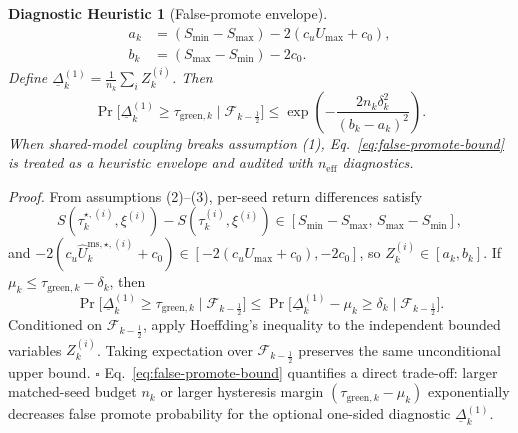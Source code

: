 \documentclass[letterpaper,10pt,conference]{ieeeconf}
\newtheorem{heuristic}{Diagnostic Heuristic}
\begin{document}
\begin{heuristic}[False-promote envelope]
\[
\begin{aligned}
a_k &= (S_{\min}-S_{\max})-2(c_uU_{\max}+c_0),\\
b_k &= (S_{\max}-S_{\min})-2c_0.
\end{aligned}
\]
Define $\underline{\Delta}_k^{(1)}=\frac{1}{n_k}\sum_i Z_k^{(i)}$. Then
\begin{equation}
\Pr\!\big[\underline{\Delta}_k^{(1)}\ge \tau_{\text{green},k}\mid \mathcal{F}_{k-\frac{1}{2}}\big]
\le
\exp\!\left(-\frac{2n_k \delta_k^2}{(b_k-a_k)^2}\right).
\label{eq:false-promote-bound}
\end{equation}
When shared-model coupling breaks assumption (1), Eq.~\ref{eq:false-promote-bound} is treated as a heuristic envelope and audited with $n_{\mathrm{eff}}$ diagnostics.
\end{heuristic}
\noindent\textit{Proof.}
From assumptions (2)--(3), per-seed return differences satisfy
\[
S(\tau_k^{\star,(i)},\xi^{(i)})-S(\tau_k^{(i)},\xi^{(i)})\in[S_{\min}-S_{\max},\,S_{\max}-S_{\min}],
\]
and $-2(c_u\widehat{U}^{\mathrm{ms},\star,(i)}_k+c_0)\in[-2(c_uU_{\max}+c_0),-2c_0]$, so
$Z_k^{(i)}\in[a_k,b_k]$.
If $\mu_k\le \tau_{\text{green},k}-\delta_k$, then
\[
\Pr\!\big[\underline{\Delta}_k^{(1)}\ge \tau_{\text{green},k}\mid \mathcal{F}_{k-\frac{1}{2}}\big]
\le
\Pr\!\big[\underline{\Delta}_k^{(1)}-\mu_k\ge \delta_k\mid \mathcal{F}_{k-\frac{1}{2}}\big].
\]
Conditioned on $\mathcal{F}_{k-\frac{1}{2}}$, apply Hoeffding's inequality to the independent bounded variables $Z_k^{(i)}$.
Taking expectation over $\mathcal{F}_{k-\frac{1}{2}}$ preserves the same unconditional upper bound.
\hfill$\square$
Eq.~\ref{eq:false-promote-bound} quantifies a direct trade-off: larger matched-seed budget $n_k$ or larger hysteresis margin $(\tau_{\text{green},k}-\mu_k)$ exponentially decreases false promote probability for the optional one-sided diagnostic $\underline{\Delta}_k^{(1)}$.
\end{document}
